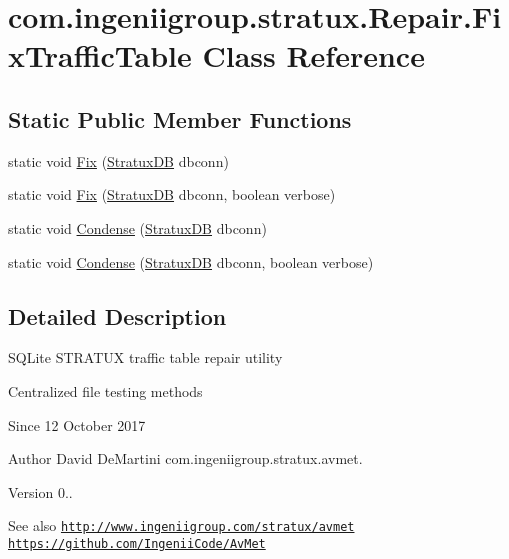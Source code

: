 \hypertarget{classcom_1_1ingeniigroup_1_1stratux_1_1_repair_1_1_fix_traffic_table}{}\section{com.\+ingeniigroup.\+stratux.\+Repair.\+Fix\+Traffic\+Table Class Reference}
\label{classcom_1_1ingeniigroup_1_1stratux_1_1_repair_1_1_fix_traffic_table}
\subsection*{Static Public Member Functions}
\begin{DoxyCompactItemize}
\item 
static void \hyperlink{classcom_1_1ingeniigroup_1_1stratux_1_1_repair_1_1_fix_traffic_table_ac1cbfba669e1e58185840d39af28f10d}{Fix} (\hyperlink{classcom_1_1ingeniigroup_1_1stratux_1_1db_connect_1_1_stratux_d_b}{Stratux\+DB} dbconn)
\item 
static void \hyperlink{classcom_1_1ingeniigroup_1_1stratux_1_1_repair_1_1_fix_traffic_table_af2aa2903bf66fd61b674a1027393019d}{Fix} (\hyperlink{classcom_1_1ingeniigroup_1_1stratux_1_1db_connect_1_1_stratux_d_b}{Stratux\+DB} dbconn, boolean verbose)
\item 
static void \hyperlink{classcom_1_1ingeniigroup_1_1stratux_1_1_repair_1_1_fix_traffic_table_a12f2919c91c184deac9b28934a50ec11}{Condense} (\hyperlink{classcom_1_1ingeniigroup_1_1stratux_1_1db_connect_1_1_stratux_d_b}{Stratux\+DB} dbconn)
\item 
static void \hyperlink{classcom_1_1ingeniigroup_1_1stratux_1_1_repair_1_1_fix_traffic_table_ac6a7b3716cf88eeeb92fe5243ca0ce81}{Condense} (\hyperlink{classcom_1_1ingeniigroup_1_1stratux_1_1db_connect_1_1_stratux_d_b}{Stratux\+DB} dbconn, boolean verbose)
\end{DoxyCompactItemize}


\subsection{Detailed Description}
S\+Q\+Lite S\+T\+R\+A\+T\+UX traffic table repair utility

Centralized file testing methods

\begin{DoxySince}{Since}
12 October 2017 
\end{DoxySince}
\begin{DoxyAuthor}{Author}
David De\+Martini  com.\+ingeniigroup.\+stratux.\+avmet. 
\end{DoxyAuthor}
\begin{DoxyVersion}{Version}
0.. 
\end{DoxyVersion}
\begin{DoxySeeAlso}{See also}
\href{http://www.ingeniigroup.com/stratux/avmet}{\tt http\+://www.\+ingeniigroup.\+com/stratux/avmet}  \href{https://github.com/IngeniiCode/AvMet}{\tt https\+://github.\+com/\+Ingenii\+Code/\+Av\+Met} 
\end{DoxySeeAlso}


